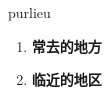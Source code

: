 
\begin{frame}
{\huge purlieu}
\begin{center}
\begin{enumerate}\Large
  \item \textbf{常去的地方}
  \item \textbf{临近的地区}
\end{enumerate}
\end{center}
\end{frame}

